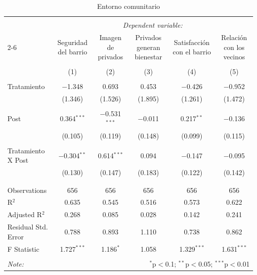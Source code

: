 
\begin{table}[H] \centering 
  \caption{Entorno comunitario} 
  \label{reg_entorno} 
\tiny 
\begin{tabular}{@{\extracolsep{-7pt}}lccccc} 
\\[-1.8ex]\hline 
\hline \\[-1.8ex] 
 & \multicolumn{5}{c}{\textit{Dependent variable:}} \\ 
\cline{2-6} 
 & Seguridad del barrio & Imagen de privados & Privados generan bienestar & Satisfacción con el barrio & Relación con los vecinos \\ 
\\[-1.8ex] & (1) & (2) & (3) & (4) & (5)\\ 
\hline \\[-1.8ex] 
 Tratamiento & $-$1.348 & 0.693 & 0.453 & $-$0.426 & $-$0.952 \\ 
  & (1.346) & (1.526) & (1.895) & (1.261) & (1.472) \\ 
  & & & & & \\ 
 Post & 0.364$^{***}$ & $-$0.531$^{***}$ & $-$0.011 & 0.217$^{**}$ & $-$0.136 \\ 
  & (0.105) & (0.119) & (0.148) & (0.099) & (0.115) \\ 
  & & & & & \\ 
 Tratamiento X Post & $-$0.304$^{**}$ & 0.614$^{***}$ & 0.094 & $-$0.147 & $-$0.095 \\ 
  & (0.130) & (0.147) & (0.183) & (0.122) & (0.142) \\ 
  & & & & & \\ 
\hline \\[-1.8ex] 
Observations & 656 & 656 & 656 & 656 & 656 \\ 
R$^{2}$ & 0.635 & 0.545 & 0.516 & 0.573 & 0.622 \\ 
Adjusted R$^{2}$ & 0.268 & 0.085 & 0.028 & 0.142 & 0.241 \\ 
Residual Std. Error & 0.788 & 0.893 & 1.110 & 0.738 & 0.862 \\ 
F Statistic & 1.727$^{***}$ & 1.186$^{*}$ & 1.058 & 1.329$^{***}$ & 1.631$^{***}$ \\ 
\hline 
\hline \\[-1.8ex] 
\textit{Note:}  & \multicolumn{5}{r}{$^{*}$p$<$0.1; $^{**}$p$<$0.05; $^{***}$p$<$0.01} \\ 
\end{tabular} 
\end{table} 
